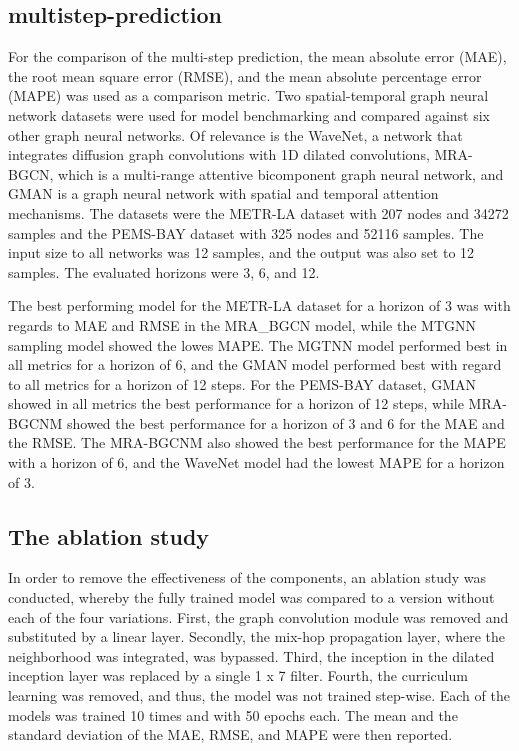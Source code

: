 \documentclass[letterpaper, twocolumn,11pt]{article}
\begin{document}
    \subsection{multistep-prediction}
    For the comparison of the multi-step prediction, the mean absolute error (MAE), the root mean square error (RMSE), and the mean absolute percentage error (MAPE) was used as a comparison metric.
    Two spatial-temporal graph neural network datasets were used for model benchmarking and compared against six other graph neural networks.
    Of relevance is the WaveNet, a network that integrates diffusion graph convolutions with 1D dilated convolutions,
    MRA-BGCN, which is a multi-range attentive bicomponent graph neural network, and
    GMAN is a graph neural network with spatial and temporal attention mechanisms.
    The datasets were the METR-LA dataset with 207 nodes and 34272 samples and the PEMS-BAY dataset with 325 nodes and 52116 samples.
    The input size to all networks was 12 samples, and the output was also set to 12 samples.
    The evaluated horizons were 3, 6, and 12.

    The best performing model for the METR-LA dataset for a horizon of 3 was with regards to MAE and RMSE in the MRA\_BGCN model, while the MTGNN sampling model showed the lowes MAPE.
    The MGTNN model performed best in all metrics for a horizon of 6, and the GMAN model performed best with regard to all metrics for a horizon of 12 steps.
    For the PEMS-BAY dataset, GMAN showed in all metrics the best performance for a horizon of 12 steps, while MRA-BGCNM showed the best performance for a horizon of 3 and 6 for the MAE and the RMSE.
    The MRA-BGCNM also showed the best performance for the MAPE with a horizon of 6, and the WaveNet model had the lowest MAPE for a horizon of 3.

    \subsection{The ablation study}
    In order to remove the effectiveness of the components, an ablation study was conducted, whereby the fully trained model was compared to a version without each of the four variations.
    First, the graph convolution module was removed and substituted by a linear layer.
    Secondly, the mix-hop propagation layer, where the neighborhood was integrated, was bypassed.
    Third, the inception in the dilated inception layer was replaced by a single 1 x 7 filter.
    Fourth, the curriculum learning was removed, and thus, the model was not trained step-wise.
    Each of the models was trained 10 times and with 50 epochs each.
    The mean and the standard deviation of the MAE, RMSE, and MAPE were then reported.
\end{document}
